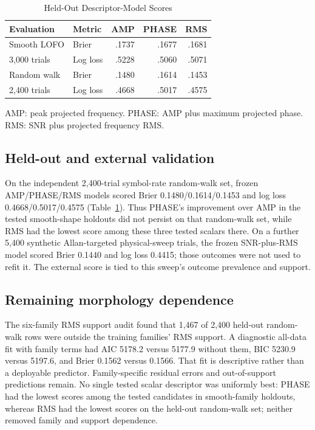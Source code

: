 \documentclass{ieeeaccess}
\begin{document}
\begin{table}[t]
\caption{Held-Out Descriptor-Model Scores}
\label{tab:descriptors}
\centering\footnotesize
\begin{tabular}{llrrr}
\toprule
Evaluation & Metric & AMP & PHASE & RMS \\
\midrule
Smooth LOFO & Brier & .1737 & .1677 & .1681 \\
3,000 trials & Log loss & .5228 & .5060 & .5071 \\
Random walk & Brier & .1480 & .1614 & .1453 \\
2,400 trials & Log loss & .4668 & .5017 & .4575 \\
\bottomrule
\end{tabular}
\vspace{2pt}
\parbox{\columnwidth}{\footnotesize AMP: peak projected frequency. PHASE: AMP plus maximum projected phase. RMS: SNR plus projected frequency RMS.}
\end{table}

\subsection{Held-out and external validation}
On the independent 2,400-trial symbol-rate random-walk set, frozen AMP/PHASE/RMS models scored Brier 0.1480/0.1614/0.1453 and log loss 0.4668/0.5017/0.4575 (Table~\ref{tab:descriptors}). Thus PHASE's improvement over AMP in the tested smooth-shape holdouts did not persist on that random-walk set, while RMS had the lowest score among these three tested scalars there. On a further 5,400 synthetic Allan-targeted physical-sweep trials, the frozen SNR-plus-RMS model scored Brier 0.1440 and log loss 0.4415; those outcomes were not used to refit it. The external score is tied to this sweep's outcome prevalence and support.

\subsection{Remaining morphology dependence}
The six-family RMS support audit found that 1,467 of 2,400 held-out random-walk rows were outside the training families' RMS support. A diagnostic all-data fit with family terms had AIC 5178.2 versus 5177.9 without them, BIC 5230.9 versus 5197.6, and Brier 0.1562 versus 0.1566. That fit is descriptive rather than a deployable predictor. Family-specific residual errors and out-of-support predictions remain. No single tested scalar descriptor was uniformly best: PHASE had the lowest scores among the tested candidates in smooth-family holdouts, whereas RMS had the lowest scores on the held-out random-walk set; neither removed family and support dependence.
\end{document}
